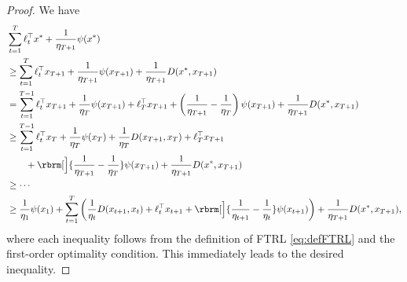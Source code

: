 \begin{proof}
    We have
    \begin{align}
        &
        \sum_{t=1}^T \ell_t^\top x^* + \frac{1}{\eta_{T+1}} \psi(x^*)
        \nonumber \\
        &
        \ge
        \sum_{t=1}^T \ell_t^\top x_{T+1} + \frac{1}{\eta_{T+1}} \psi(x_{T+1})
        +
        \frac{1}{\eta_{T+1}} D(x^*, x_{T+1})
        \nonumber \\
        &
        =
        \sum_{t=1}^{T-1} \ell_t^\top x_{T+1} + 
        \frac{1}{\eta_{T}} \psi(x_{T+1})
        +
        \ell_{T}^\top x_{T+1}
        +
        \left(
        \frac{1}{\eta_{T+1}} 
        -
        \frac{1}{\eta_{T}} 
        \right)
        \psi(x_{T+1})
        +
        \frac{1}{\eta_{T+1}} D(x^*, x_{T+1})
        \nonumber \\
        &
        \ge
        \sum_{t=1}^{T-1} \ell_t^\top x_{T} + 
        \frac{1}{\eta_{T}} \psi(x_{T})
        +
        \frac{1}{\eta_{T}} D(x_{T+1},x_T)
        +
        \ell_{T}^\top x_{T+1}
        \nonumber\\
        &\qquad+
        \rbrm[\Big]{
        \frac{1}{\eta_{T+1}} 
        -
        \frac{1}{\eta_{T}} 
        }
        \psi(x_{T+1})
        +
        \frac{1}{\eta_{T+1}} D(x^*, x_{T+1})
        \nonumber \\
        &
        \ge
        \cdots
        \nonumber \\
        &\ge
        \frac{1}{\eta_1} \psi(x_{1})
        +
        \sum_{t=1}^{T} 
        \left(
        \frac{1}{\eta_t}
        D(x_{t+1}, x_t)
        +
        \ell_t^\top x_{t+1}
        +
        \rbrm[\Big]{
        \frac{1}{\eta_{t+1}} 
        -
        \frac{1}{\eta_{t}} 
        }
        \psi(x_{t+1})
        \right)
        +
        \frac{1}{\eta_{T+1}} D(x^*, x_{T+1}),
        \nonumber 
    \end{align}
    where each inequality follows from the definition of FTRL \eqref{eq:defFTRL}
    and the first-order optimality condition.
    This immediately leads to the desired inequality.
\end{proof}

